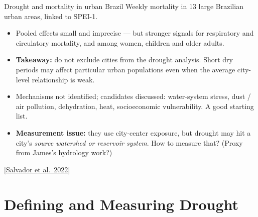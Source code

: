 \documentclass[10pt, aspectratio=169]{beamer}
\newcommand{\paperlink}[2]{\href{#1}{\textcolor{blue!50!black}{\footnotesize [#2]}}}
\begin{document}
\begin{frame}{Drought and mortality in urban Brazil}
  Weekly mortality in 13 large Brazilian urban areas, linked to SPEI-1.
  \vspace{0.6em}
  \begin{itemize}
    \item Pooled effects small and imprecise --- but stronger signals for
          respiratory and circulatory mortality, and among women, children and
          older adults.
    \item \textbf{Takeaway:} do not exclude cities from the drought analysis.
          Short dry periods may affect particular urban populations even when
          the average city-level relationship is weak.
    \item Mechanisms not identified; candidates discussed: water-system
          stress, dust / air pollution, dehydration, heat, socioeconomic
          vulnerability. A good starting list.
    \item \textbf{Measurement issue:} they use city-center exposure, but drought
          may hit a city's \emph{source watershed or reservoir system}. How to
          measure that? (Proxy from James's hydrology work?)
  \end{itemize}
  \vfill
    \paperlink{https://doi.org/10.1029/2021GH000534}{Salvador et al.\ 2022}
\end{frame}

\section{Defining and Measuring Drought}
\end{document}
